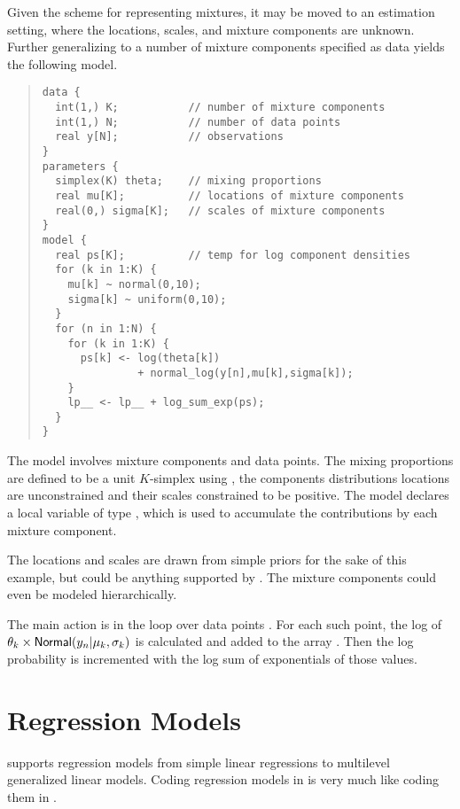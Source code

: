 Given the scheme for representing mixtures, it may be moved to an
estimation setting, where the locations, scales, and mixture
components are unknown.  Further generalizing to a number of mixture
components specified as data yields the following model.
%
\begin{quote}
\begin{Verbatim}
data {
  int(1,) K;           // number of mixture components
  int(1,) N;           // number of data points
  real y[N];           // observations
}
parameters {
  simplex(K) theta;    // mixing proportions
  real mu[K];          // locations of mixture components
  real(0,) sigma[K];   // scales of mixture components
}
model {
  real ps[K];          // temp for log component densities
  for (k in 1:K) {
    mu[k] ~ normal(0,10);
    sigma[k] ~ uniform(0,10);
  }
  for (n in 1:N) {
    for (k in 1:K) {
      ps[k] <- log(theta[k]) 
               + normal_log(y[n],mu[k],sigma[k]);
    }
    lp__ <- lp__ + log_sum_exp(ps);    
  }
}
\end{Verbatim}
\end{quote}
%
The model involves  mixture components and  data
points.  The mixing proportions are defined to be a unit $K$-simplex
using , the components distributions locations
 are unconstrained and their scales 
constrained to be positive.  The model declares a local variable
 of type , which is used to accumulate the
contributions by each mixture component.

The locations and scales are drawn from simple priors for the sake of
this example, but could be anything supported by \Stan.  The mixture
components  could even be modeled hierarchically.

The main action is in the loop over data points .  For each
such point, the log of $\theta_k \times
\mbox{\sf Normal}(y_n|\mu_k,\sigma_k)$ is calculated and added to the
array .  Then the log probability is incremented with the log
sum of exponentials of those values.





\chapter{Regression Models}

\noindent
\Stan supports regression models from simple linear regressions to
multilevel generalized linear models.  Coding regression models in
\Stan is very much like coding them in \BUGS.

